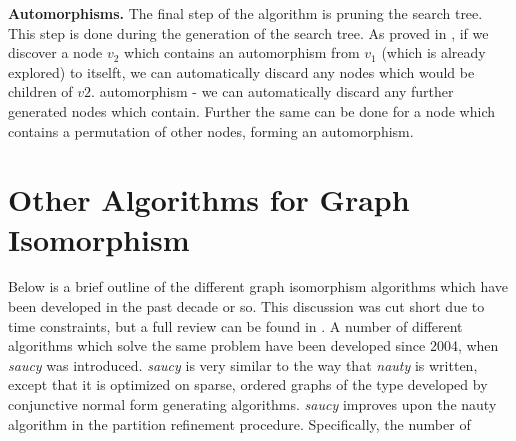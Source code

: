 \textbf{Automorphisms.} The final step of the algorithm is pruning the search tree. This step is done during the generation of the search tree. As proved in \cite{mckay81}, if we discover a node $v_2$ which contains an automorphism from $v_1$ (which is already explored) to itselft, we can automatically discard any nodes which would be children of $v2$. automorphism - we can automatically discard any further generated nodes which contain. Further the same can be done for a node which contains a permutation of other nodes, forming an automorphism. 

\section{Other Algorithms for Graph Isomorphism}{
	Below is a brief outline of the different graph isomorphism algorithms which have been developed in the past decade or so. This discussion was cut short due to time constraints, but a full review can be found in \cite{mckay13}. 
	A number of different algorithms which solve the same problem have been developed since 2004, when \emph{saucy} \cite{darga04} was introduced. \emph{saucy} is very similar to the way that \emph{nauty} is written, except that it is optimized on sparse, ordered graphs of the type developed by conjunctive normal form generating algorithms. \emph{saucy} improves upon the nauty algorithm in the partition refinement procedure. Specifically, the number of 
}






